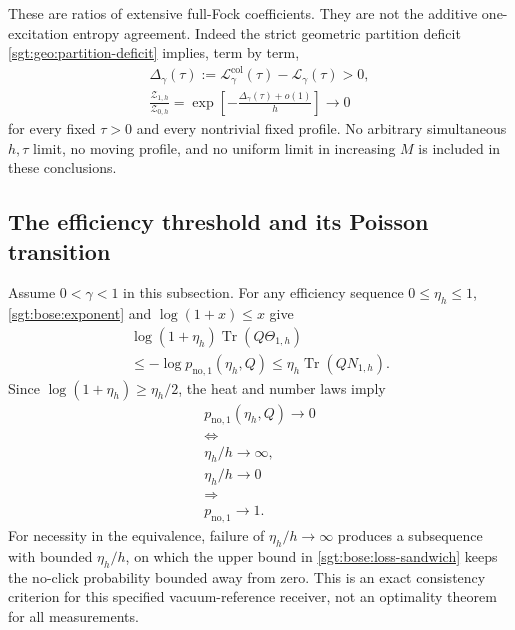 \documentclass[aps,pra,reprint,superscriptaddress,longbibliography]{revtex4-2}
\newcommand{\Tr}{\operatorname{Tr}}
\begin{document}
These are ratios of extensive full-Fock coefficients.  They are not the
additive one-excitation entropy agreement.  Indeed the strict geometric
partition deficit \eqref{sgt:geo:partition-deficit} implies, term by term,
\begin{equation}
\begin{gathered}
 \Delta_\gamma(\tau)
   :=\mathcal L_\gamma^{\mathrm{col}}(\tau)
                  -\mathcal L_\gamma(\tau)>0,
 \\
 \frac{\mathcal Z_{1,h}}{\mathcal Z_{0,h}}
   =\exp\!\left[-\frac{\Delta_\gamma(\tau)+o(1)}h\right]
   \longrightarrow0
 \label{sgt:bose:partition-ratio}
\end{gathered}
\end{equation}
for every fixed $\tau>0$ and every nontrivial fixed profile.
No arbitrary simultaneous $h,\tau$ limit, no moving profile, and no
uniform limit in increasing $M$ is included in these conclusions.

\subsection{The efficiency threshold and its Poisson transition}
\label{sgt:bose:efficiency}

Assume $0<\gamma<1$ in this subsection.  For any efficiency sequence
$0\le\eta_h\le1$, \eqref{sgt:bose:exponent} and
$\log(1+x)\le x$ give
\begin{equation}
\begin{gathered}
 \log(1+\eta_h)\Tr(Q\Theta_{1,h})
\\
 \le-\log p_{\mathrm{no},1}(\eta_h,Q)
 \le\eta_h\Tr(QN_{1,h}).
 \label{sgt:bose:loss-sandwich}
\end{gathered}
\end{equation}
Since $\log(1+\eta_h)\ge\eta_h/2$, the heat and number laws imply
\begin{equation}
\begin{gathered}
 p_{\mathrm{no},1}(\eta_h,Q)\to0
       \\
\Longleftrightarrow\\
\eta_h/h\to\infty,
 \\
 \eta_h/h\to0\\
\Longrightarrow\\
 p_{\mathrm{no},1}\to1.
 \label{sgt:bose:loss-threshold}
\end{gathered}
\end{equation}
For necessity in the equivalence, failure of $\eta_h/h\to\infty$
produces a subsequence with bounded $\eta_h/h$, on which the upper bound
in \eqref{sgt:bose:loss-sandwich} keeps the no-click probability bounded
away from zero.  This is an exact consistency criterion for this specified
vacuum-reference receiver, not an optimality theorem for all measurements.
\end{document}
